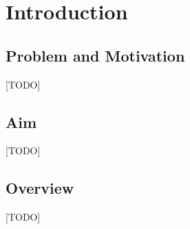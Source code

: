 
\chapter{Introduction}
\label{chap:introduction}

\section{Problem and Motivation}
\label{sec:intro-problem-and-motivation}

[TODO]

\section{Aim}
\label{sec:intro-aim}

[TODO]

\section{Overview}
\label{sec:intro-overview}

[TODO]

